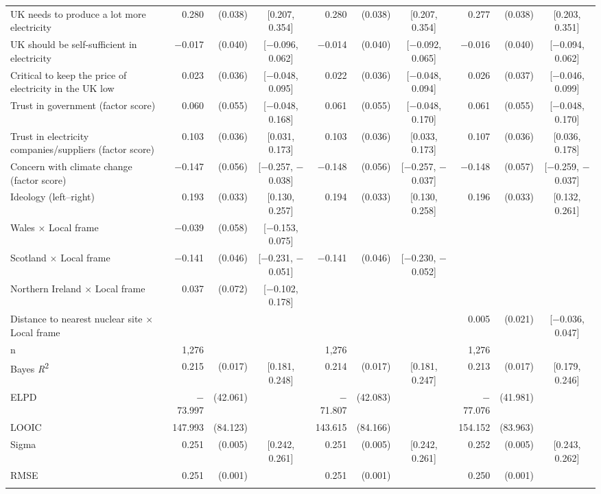 \begin{landscape}
\begin{longtable}[t]{>{\raggedright\arraybackslash}p{2.8in}rrcrrcrrc}
UK needs to produce a lot more electricity & 0.280 & (0.038) & {}[0.207, 0.354] & 0.280 & (0.038) & {}[0.207, 0.354] & 0.277 & (0.038) & {}[0.203, 0.351]\\
UK should be self-sufficient in electricity & $-$0.017 & (0.040) & {}[$-$0.096, 0.062] & $-$0.014 & (0.040) & {}[$-$0.092, 0.065] & $-$0.016 & (0.040) & {}[$-$0.094, 0.062]\\
Critical to keep the price of electricity in the UK low & 0.023 & (0.036) & {}[$-$0.048, 0.095] & 0.022 & (0.036) & {}[$-$0.048, 0.094] & 0.026 & (0.037) & {}[$-$0.046, 0.099]\\
Trust in government (factor score) & 0.060 & (0.055) & {}[$-$0.048, 0.168] & 0.061 & (0.055) & {}[$-$0.048, 0.170] & 0.061 & (0.055) & {}[$-$0.048, 0.170]\\
Trust in electricity companies/suppliers (factor score) & 0.103 & (0.036) & {}[0.031, 0.173] & 0.103 & (0.036) & {}[0.033, 0.173] & 0.107 & (0.036) & {}[0.036, 0.178]\\
Concern with climate change (factor score) & $-$0.147 & (0.056) & {}[$-$0.257, $-$0.038] & $-$0.148 & (0.056) & {}[$-$0.257, $-$0.037] & $-$0.148 & (0.057) & {}[$-$0.259, $-$0.037]\\
Ideology (left--right) & 0.193 & (0.033) & {}[0.130, 0.257] & 0.194 & (0.033) & {}[0.130, 0.258] & 0.196 & (0.033) & {}[0.132, 0.261]\\
Wales $\times$ Local frame & $-$0.039 & (0.058) & {}[$-$0.153, 0.075] &  &  &  &  &  & \\
Scotland $\times$ Local frame & $-$0.141 & (0.046) & {}[$-$0.231, $-$0.051] & $-$0.141 & (0.046) & {}[$-$0.230, $-$0.052] &  &  & \\
Northern Ireland $\times$ Local frame & 0.037 & (0.072) & {}[$-$0.102, 0.178] &  &  &  &  &  & \\
Distance to nearest nuclear site $\times$ Local frame &  &  &  &  &  &  & 0.005 & (0.021) & {}[$-$0.036, 0.047]\\
\midrule
n & 1,276 &  &  & 1,276 &  &  & 1,276 &  & \\
Bayes \textit{R}\textsuperscript{2} & 0.215 & (0.017) & {}[0.181, 0.248] & 0.214 & (0.017) & {}[0.181, 0.247] & 0.213 & (0.017) & {}[0.179, 0.246]\\
ELPD & $-$73.997 & (42.061) &  & $-$71.807 & (42.083) &  & $-$77.076 & (41.981) & \\
LOOIC & 147.993 & (84.123) &  & 143.615 & (84.166) &  & 154.152 & (83.963) & \\
Sigma & 0.251 & (0.005) & {}[0.242, 0.261] & 0.251 & (0.005) & {}[0.242, 0.261] & 0.252 & (0.005) & {}[0.243, 0.262]\\
RMSE & 0.251 & (0.001) &  & 0.251 & (0.001) &  & 0.250 & (0.001) & \\*
\end{longtable}


\end{landscape}
